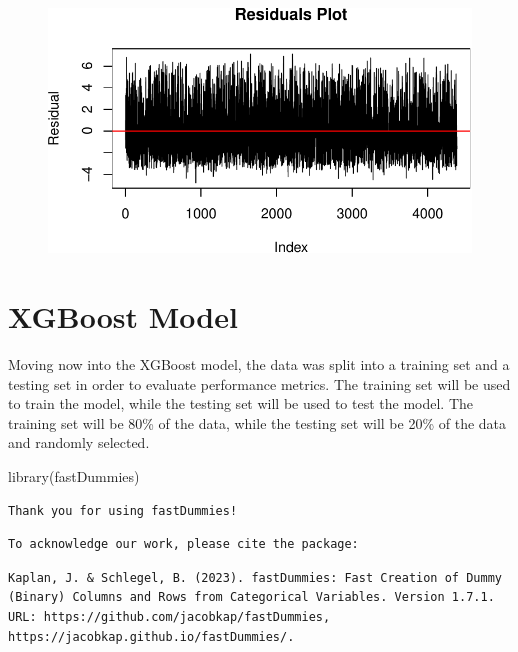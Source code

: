 \documentclass[
  super,
  preprint,
  3p]{elsarticle}
\newenvironment{Shaded}{\begin{snugshade}}{\end{snugshade}}
\newcommand{\FunctionTok}[1]{\textcolor[rgb]{0.28,0.35,0.67}{#1}}
\newcommand{\NormalTok}[1]{\textcolor[rgb]{0.00,0.23,0.31}{#1}}
\begin{document}
\begin{figure}[H]

{\centering \includegraphics{project_report_files/figure-pdf/unnamed-chunk-29-1.pdf}

}

\end{figure}

\hypertarget{xgboost-model}{%
\section{XGBoost Model}\label{xgboost-model}}

Moving now into the XGBoost model, the data was split into a training
set and a testing set in order to evaluate performance metrics. The
training set will be used to train the model, while the testing set will
be used to test the model. The training set will be 80\% of the data,
while the testing set will be 20\% of the data and randomly selected.

\begin{Shaded}
\begin{Highlighting}[]
\FunctionTok{library}\NormalTok{(fastDummies)}
\end{Highlighting}
\end{Shaded}

\begin{verbatim}
Thank you for using fastDummies!
\end{verbatim}

\begin{verbatim}
To acknowledge our work, please cite the package:
\end{verbatim}

\begin{verbatim}
Kaplan, J. & Schlegel, B. (2023). fastDummies: Fast Creation of Dummy (Binary) Columns and Rows from Categorical Variables. Version 1.7.1. URL: https://github.com/jacobkap/fastDummies, https://jacobkap.github.io/fastDummies/.
\end{verbatim}
\end{document}
